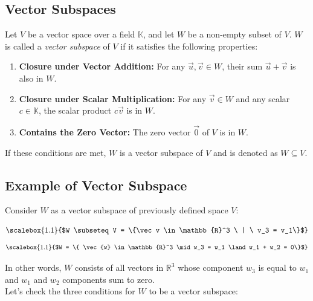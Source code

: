 \subsection{Vector Subspaces}

\begin{tcolorbox}[colback=def_color,colframe=gray] \begin{definition}
    Let $V$ be a vector space over a field $\mathbb{K}$, and let $W$ be a non-empty subset of $V$. $W$ is called a \emph{vector subspace} of $V$ if it satisfies the following properties:

\begin{enumerate}
    \item \textbf{Closure under Vector Addition:} For any $\vec{u}, \vec{v} \in W$, their sum $\vec{u} + \vec{v}$ is also in $W$.
    
    \item \textbf{Closure under Scalar Multiplication:} For any $\vec{v} \in W$ and any scalar $c \in \mathbb{K}$, the scalar product $c\vec{v}$ is in $W$.
    
    \item \textbf{Contains the Zero Vector:} The zero vector $\vec{0}$ of $V$ is in $W$.
\end{enumerate}

If these conditions are met, $W$ is a vector subspace of $V$ and is denoted as $W \subseteq V$.
\end{definition}
\end{tcolorbox}

\subsection{Example of Vector Subspace}
Consider \(W\) as a vector subspace of previously defined space \(V\):

$$
\scalebox{1.1}{$W \subseteq V = \{\vec v \in \mathbb{R}^3 \ | \ v_3 = v_1\}$}
$$$$
\scalebox{1.1}{$W = \{ \vec{w} \in \mathbb{R}^3 \mid w_3 = w_1 \land w_1 + w_2 = 0\}$}
$$

In other words, \(W\) consists of all vectors in \(\mathbb{R}^3\) whose component $w_3$ is equal to $w_1$ and $w_1$ and $w_2$ components sum to zero.
\\

Let's check the three conditions for \(W\) to be a vector subspace:


